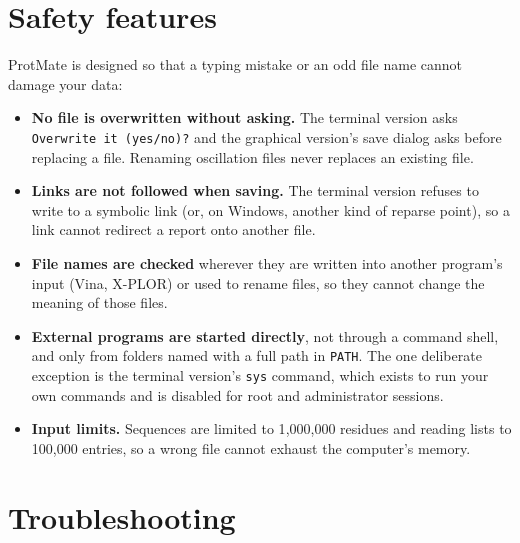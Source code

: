 \documentclass[11pt,a4paper,oneside]{report}
\newcommand{\cmd}[1]{\texttt{#1}}            %
\begin{document}
\chapter{Safety features}

ProtMate is designed so that a typing mistake or an odd file name cannot damage your data:

\begin{itemize}
  \item \textbf{No file is overwritten without asking.} The terminal version asks
        \cmd{Overwrite it (yes/no)?} and the graphical version's save dialog asks before replacing
        a file. Renaming oscillation files never replaces an existing file.
  \item \textbf{Links are not followed when saving.} The terminal version refuses to write to a
        symbolic link (or, on Windows, another kind of reparse point), so a link cannot redirect a
        report onto another file.
  \item \textbf{File names are checked} wherever they are written into another program's input
        (Vina, X-PLOR) or used to rename files, so they cannot change the meaning of those files.
  \item \textbf{External programs are started directly}, not through a command shell, and only from
        folders named with a full path in \cmd{PATH}. The one deliberate exception is the terminal
        version's \cmd{sys} command, which exists to run your own commands and is disabled for root
        and administrator sessions.
  \item \textbf{Input limits.} Sequences are limited to 1{,}000{,}000 residues and reading lists to
        100{,}000 entries, so a wrong file cannot exhaust the computer's memory.
\end{itemize}

\chapter{Troubleshooting}
\end{document}
